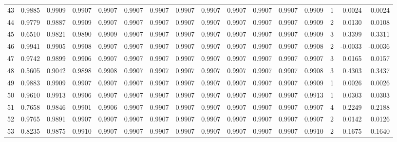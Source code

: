 \begin{tabular}{lrrrrrrrrrrrrrrr}
43  &      0.9885 &  0.9909 &  0.9907 &  0.9907 &  0.9907 &  0.9907 &  0.9907 &  0.9907 &  0.9907 &  0.9907 &   0.9907 &     0.9909 &      1 &                    0.0024 &                     0.0024 \\
44  &      0.9779 &  0.9887 &  0.9909 &  0.9907 &  0.9907 &  0.9907 &  0.9907 &  0.9907 &  0.9907 &  0.9907 &   0.9907 &     0.9909 &      2 &                    0.0130 &                     0.0108 \\
45  &      0.6510 &  0.9821 &  0.9890 &  0.9909 &  0.9907 &  0.9907 &  0.9907 &  0.9907 &  0.9907 &  0.9907 &   0.9907 &     0.9909 &      3 &                    0.3399 &                     0.3311 \\
46  &      0.9941 &  0.9905 &  0.9908 &  0.9907 &  0.9907 &  0.9907 &  0.9907 &  0.9907 &  0.9907 &  0.9907 &   0.9907 &     0.9908 &      2 &                   -0.0033 &                    -0.0036 \\
47  &      0.9742 &  0.9899 &  0.9906 &  0.9907 &  0.9907 &  0.9907 &  0.9907 &  0.9907 &  0.9907 &  0.9907 &   0.9907 &     0.9907 &      3 &                    0.0165 &                     0.0157 \\
48  &      0.5605 &  0.9042 &  0.9898 &  0.9908 &  0.9907 &  0.9907 &  0.9907 &  0.9907 &  0.9907 &  0.9907 &   0.9907 &     0.9908 &      3 &                    0.4303 &                     0.3437 \\
49  &      0.9883 &  0.9909 &  0.9907 &  0.9907 &  0.9907 &  0.9907 &  0.9907 &  0.9907 &  0.9907 &  0.9907 &   0.9907 &     0.9909 &      1 &                    0.0026 &                     0.0026 \\
50  &      0.9610 &  0.9913 &  0.9906 &  0.9907 &  0.9907 &  0.9907 &  0.9907 &  0.9907 &  0.9907 &  0.9907 &   0.9907 &     0.9913 &      1 &                    0.0303 &                     0.0303 \\
51  &      0.7658 &  0.9846 &  0.9901 &  0.9906 &  0.9907 &  0.9907 &  0.9907 &  0.9907 &  0.9907 &  0.9907 &   0.9907 &     0.9907 &      4 &                    0.2249 &                     0.2188 \\
52  &      0.9765 &  0.9891 &  0.9907 &  0.9907 &  0.9907 &  0.9907 &  0.9907 &  0.9907 &  0.9907 &  0.9907 &   0.9907 &     0.9907 &      2 &                    0.0142 &                     0.0126 \\
53  &      0.8235 &  0.9875 &  0.9910 &  0.9907 &  0.9907 &  0.9907 &  0.9907 &  0.9907 &  0.9907 &  0.9907 &   0.9907 &     0.9910 &      2 &                    0.1675 &                     0.1640 \\

\end{tabular}
